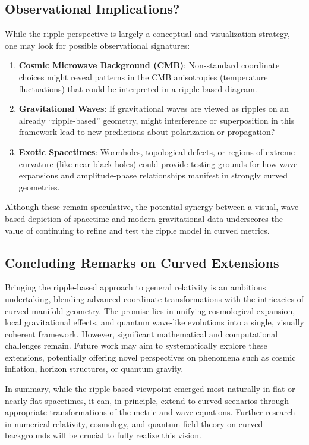 \documentclass[11pt]{article}
\begin{document}
\subsection{Observational Implications?}
\label{app:subsec:observation}
While the ripple perspective is largely a conceptual and visualization strategy, 
one may look for possible observational signatures:
\begin{enumerate}
  \item \textbf{Cosmic Microwave Background (CMB)}: 
    Non-standard coordinate choices might reveal patterns in the CMB 
    anisotropies (temperature fluctuations) that could be interpreted 
    in a ripple-based diagram.  
  \item \textbf{Gravitational Waves}: 
    If gravitational waves are viewed as ripples on an already 
    “ripple-based” geometry, might interference or superposition 
    in this framework lead to new predictions about polarization 
    or propagation?  
  \item \textbf{Exotic Spacetimes}: 
    Wormholes, topological defects, or regions of extreme curvature 
    (like near black holes) could provide testing grounds for how 
    wave expansions and amplitude-phase relationships manifest in 
    strongly curved geometries.
\end{enumerate}

\noindent
Although these remain speculative, the potential synergy between a 
visual, wave-based depiction of spacetime and modern gravitational 
data underscores the value of continuing to refine and test the 
ripple model in curved metrics.

\subsection{Concluding Remarks on Curved Extensions}
\label{app:subsec:curved-conclusion}
Bringing the ripple-based approach to general relativity is an ambitious 
undertaking, blending advanced coordinate transformations with the 
intricacies of curved manifold geometry. The promise lies in unifying 
cosmological expansion, local gravitational effects, and quantum 
wave-like evolutions into a single, visually coherent framework. 
However, significant mathematical and computational challenges remain. 
Future work may aim to systematically explore these extensions, 
potentially offering novel perspectives on phenomena such as cosmic 
inflation, horizon structures, or quantum gravity.

\bigskip
\noindent
In summary, while the ripple-based viewpoint emerged most naturally in 
flat or nearly flat spacetimes, it can, in principle, extend to curved 
scenarios through appropriate transformations of the metric and wave 
equations. Further research in numerical relativity, cosmology, and 
quantum field theory on curved backgrounds will be crucial to fully 
realize this vision.
\end{document}
